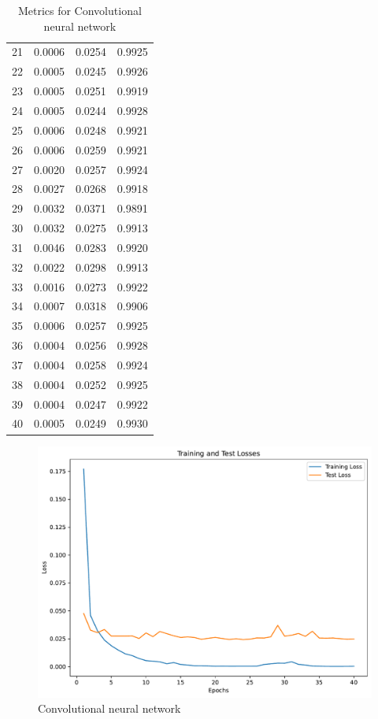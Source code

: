 \documentclass[a4paper]{article}
\begin{document}
\begin{table}
\begin{center}
\begin{tabular}{ l|l|l|l }
    21 & 0.0006 & 0.0254 & 0.9925 \\
    22 & 0.0005 & 0.0245 & 0.9926 \\
    23 & 0.0005 & 0.0251 & 0.9919 \\
    24 & 0.0005 & 0.0244 & 0.9928 \\
    25 & 0.0006 & 0.0248 & 0.9921 \\
    26 & 0.0006 & 0.0259 & 0.9921 \\
    27 & 0.0020 & 0.0257 & 0.9924 \\
    28 & 0.0027 & 0.0268 & 0.9918 \\
    29 & 0.0032 & 0.0371 & 0.9891 \\
    30 & 0.0032 & 0.0275 & 0.9913 \\
    31 & 0.0046 & 0.0283 & 0.9920 \\
    32 & 0.0022 & 0.0298 & 0.9913 \\
    33 & 0.0016 & 0.0273 & 0.9922 \\
    34 & 0.0007 & 0.0318 & 0.9906 \\
    35 & 0.0006 & 0.0257 & 0.9925 \\
    36 & 0.0004 & 0.0256 & 0.9928 \\
    37 & 0.0004 & 0.0258 & 0.9924 \\
    38 & 0.0004 & 0.0252 & 0.9925 \\
    39 & 0.0004 & 0.0247 & 0.9922 \\
    40 & 0.0005 & 0.0249 & 0.9930 \\
  \end{tabular}
\end{center}
\caption{Metrics for Convolutional neural network}
  \label{tabular:convolutional_neural_network_metrics}
\end{table}


\begin{figure}[H]
  \begin{center}
    \includegraphics[width=\textwidth]{ola/cnn.pdf}
    \caption{Convolutional neural network}
    \label{fig:convolutional_neural_network}
  \end{center}
\end{figure}
\end{document}

